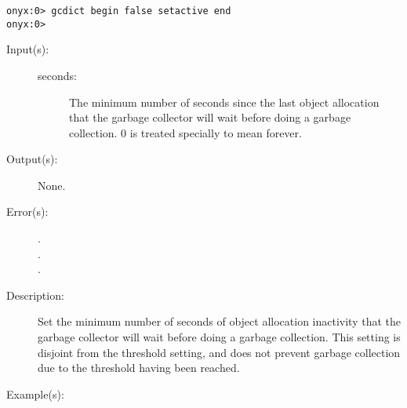 \begin{description}
\begin{description}
\begin{verbatim}
onyx:0> gcdict begin false setactive end
onyx:0>
		\end{verbatim}
	\end{description}
\label{gcdict:setperiod}
\item[{\onyxop{seconds}{setperiod}{--}}: ]
	\begin{description}\item[]
	\item[Input(s): ]
		\begin{description}\item[]
		\item[seconds: ]
			The minimum number of seconds since the last object
			allocation that the garbage collector will wait before
			doing a garbage collection.  0 is treated specially to
			mean forever.
		\end{description}
	\item[Output(s): ] None.
	\item[Error(s): ]
		\begin{description}\item[]
		\item[.]
		\item[.]
		\item[.]
		\end{description}
	\item[Description: ]
		Set the minimum number of seconds of object allocation
		inactivity that the garbage collector will wait before doing a
		garbage collection.  This setting is disjoint from the threshold
		setting, and does not prevent garbage collection due to the
		threshold having been reached.
	\item[Example(s): ]\begin{verbatim}


\end{verbatim}
\end{description}
\end{description}
